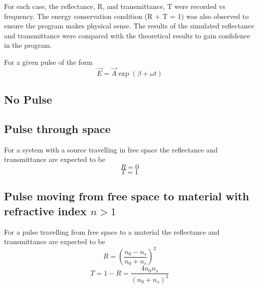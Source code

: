 \documentclass{article}
\begin{document}
For each case, the reflectance, R, and transmittance, T were recorded vs frequency. The energy conservation condition (R + T = 1) was also observed to ensure the program makes physical sense. The results of the simulated reflectance and transmittance were compared with the theoretical results to gain confidence in the program.

For a given pulse of the form
\begin{equation}
\vec{E} = \vec{A} \exp(\beta + \omega t)
\end{equation}

\subsection{No Pulse}


\subsection{Pulse through space}
For a system with a source travelling in free space the reflectance and transmittance are expected to be 
\begin{equation}
R = 0
\end{equation}
\begin{equation}
T = 1
\end{equation}
\subsection{Pulse moving from free space to material with refractive index $n>1$}
For a pulse travelling from free space to a material the reflectance and transmittance are expected to be
\begin{equation}
R = \left(\frac{n_0 - n_s}{n_0 + n_s}\right)^2
\end{equation}
\begin{equation}
T = 1 - R = \frac{4n_0 n_s}{(n_0 + n_s)^2}
\end{equation}
\end{document}
